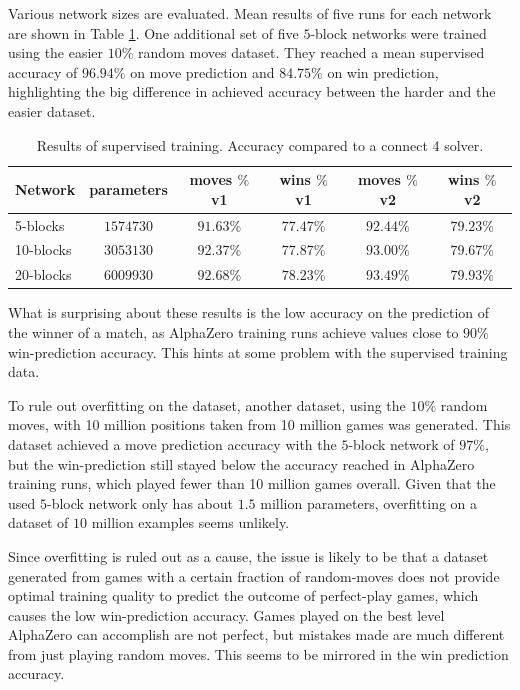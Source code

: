 \documentclass[12pt,onecolumn,oneside,titlepage]{article}
\begin{document}
Various network sizes are evaluated. Mean results of five runs for each network are shown in Table \ref{t:supervised_results}.
One additional set of five $5$-block networks were trained using the easier $10\%$ random moves dataset. They reached a mean supervised accuracy
of $96.94\%$ on move prediction and $84.75\%$ on win prediction, highlighting the big difference in achieved accuracy between the harder and the easier dataset.

\begin{table} [H]
 \centering
  \begin{tabular}{ l | c c c c c }
  Network & parameters & moves $\%$ v1 & wins $\%$ v1 & moves $\%$ v2 & wins $\%$ v2 \\
  \hline
  5-blocks & $1574730$ & $91.63\%$ & $77.47\%$ & $92.44\%$ & $79.23\%$ \\
  10-blocks & $3053130$ & $92.37\%$ & $77.87\%$ & $93.00\%$ & $79.67\%$ \\
  20-blocks & $6009930$ & $92.68\%$ & $78.23\%$ & $93.49\%$ & $79.93\%$ \\
  \end{tabular}
  \caption{Results of supervised training. Accuracy compared to a connect 4 solver.}
  \label{t:supervised_results}
\end{table}


What is surprising about these results is the low accuracy on the prediction of the winner of a match, as AlphaZero training runs achieve values close to $90\%$ win-prediction accuracy.
This hints at some problem with the supervised training data.

To rule out overfitting on the dataset, another dataset, using the $10\%$ random moves, with 10 million positions taken from 10 million games was generated.
This dataset achieved a move prediction accuracy with the $5$-block network 
of $97\%$, but the win-prediction still stayed below the accuracy reached in AlphaZero training runs, which played fewer than 10 million games overall.
Given that the used $5$-block network only has about $1.5$ million parameters, overfitting on a dataset of $10$ million examples seems unlikely.

Since overfitting is ruled out as a cause, the issue is likely to be that a dataset generated from games with a certain 
fraction of random-moves does not provide optimal training quality to predict the outcome of perfect-play games, which causes the low win-prediction accuracy.
Games played on the best level AlphaZero can accomplish are not perfect, but mistakes made are much different from just playing random moves. This seems to be mirrored in the win prediction accuracy.
\end{document}
